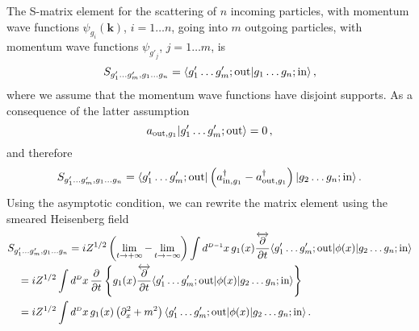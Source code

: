 The S-matrix element for the scattering of $n$ incoming particles, with momentum wave 
functions $\psi_{g_i}(\mathbf{k})$, $i=1 \ldots n$, going into $m$ outgoing 
particles, with momentum wave functions $\psi_{g'_j}$, $j=1 \ldots m$, is 
\begin{equation}
    \label{eq:SMatrixNToM}
    S_{g'_1 \ldots g'_m, g_1 \ldots g_n} =
    \langle g'_1 \ldots g'_m; \mathrm{out} | g_1 \ldots g_n; \mathrm{in} \rangle\, , 
\end{equation}
where we assume that the momentum wave functions have disjoint supports. As a consequence of 
the latter assumption
\begin{equation}
    a_{\mathrm{out}, g_1} | g'_1 \ldots g'_m; \mathrm{out} \rangle = 0\, ,
\end{equation}
and therefore
\begin{equation}
    \label{eq:ReductionStepOne}
    S_{g'_1 \ldots g'_m, g_1 \ldots g_n} =
    \langle g'_1 \ldots g'_m; \mathrm{out} |
    \left(a_{\mathrm{in},g_1}^\dagger - a_{\mathrm{out}, g_1}^\dagger\right)
    | g_2 \ldots g_n; \mathrm{in} \rangle \, .
\end{equation}
Using the asymptotic condition, we can rewrite the matrix element using the smeared
Heisenberg field 
\begin{align}
    &S_{g'_1 \ldots g'_m, g_1 \ldots g_n} = 
    i Z^{1/2} \left(\lim_{t\to +\infty} - \lim_{t\to -\infty}\right) 
    \int d^{\scriptscriptstyle{D-1}}x \, g_1(x) \frac{\overleftrightarrow{\partial}}{\partial t} 
    \langle g'_1 \ldots g'_m; \mathrm{out} | \phi(x) | g_2 \ldots g_n;\mathrm{in} \rangle 
    \nonumber \\
    & \quad = 
    i Z^{1/2} \int d^{\scriptscriptstyle{D}}x\, \frac{\partial}{\partial t} 
    \left\{
        g_1(x) \frac{\overleftrightarrow{\partial}}{\partial t} 
    \langle g'_1 \ldots g'_m; \mathrm{out} | \phi(x) | g_2 \ldots g_n;\mathrm{in} \rangle
    \right\} \\
    & \quad = 
    i Z^{1/2} \int d^{\scriptscriptstyle{D}}x\, 
    g_1(x) \left(\partial_x^2 + m^2\right)  
    \langle g'_1 \ldots g'_m; \mathrm{out} | \phi(x) | g_2 \ldots g_n;\mathrm{in} \rangle
    \, .
\end{align}